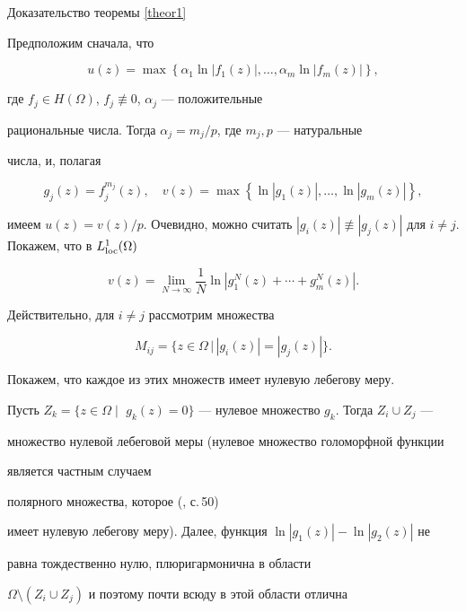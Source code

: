 \begin{pf*}{Доказательство теоремы \ref{theor1}}


Предположим сначала, что


$$


u(z)=\max\left\{\alpha_1\ln|f_1(z)|,\dotsc,\alpha_m\ln|f_m(z)|\right\},


$$


где $f_j\in H(\Omega)$, $f_j\not\equiv 0$, $\alpha_j$ --- положительные 


рациональные числа. Тогда $\alpha_j=m_j/p$, где $m_j,p$ --- натуральные 


числа, и, полагая 


$$


g_j(z)=f_j^{m_j}(z),\quad 


v(z)=\max\left\{\ln|g_1(z)|,\dotsc,\ln|g_m(z)|\right\},


$$


имеем $u(z)=v(z)/p$. Очевидно, можно считать $|g_i(z)|\not\equiv 


|g_j(z)|$ для $i\ne j$. Покажем, что в $L^1_{\loc}(\Omega)$ 


$$


v(z)=\lim\limits_{N\to\infty}\frac1N


\ln\left|g_1^N(z)+\dotsb+g_m^N(z)\right|.


$$


Действительно, для $i\ne j$ рассмотрим множества


$$


M_{ij}=\{z\in\Omega\,\big|\, |g_i(z)|=|g_j(z)|\}.


$$


Покажем, что каждое из этих множеств имеет нулевую лебегову меру. 


Пусть $Z_k=\{z\in\Omega\mid$ $ g_k(z)=




0\}$ --- нулевое множество $g_k$. Тогда $Z_i\cup Z_j$ --- 


множество нулевой лебеговой меры (нулевое множество голоморфной функции 


является частным случаем


полярного множества, которое (\cite{Ronk}, с.\,50) 


имеет нулевую лебегову меру). Далее, функция $\ln|g_1(z)|-\ln|g_2(z)|$ не 


равна тождественно нулю, плюригармонична в области 


$\Omega\setminus(Z_i\cup Z_j)$ и поэтому почти всюду в этой области отлична 



\end{pf*}
